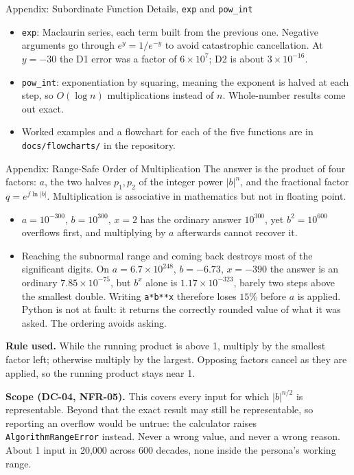 \documentclass[11pt]{beamer}
\begin{document}
\begin{frame}{Appendix: Subordinate Function Details, \texttt{exp} and \texttt{pow\_int}}
  \begin{itemize}
    \item \texttt{exp}: Maclaurin series, each term built from the previous
          one. Negative arguments go through $e^{y} = 1/e^{-y}$ to avoid
          catastrophic cancellation. At $y = -30$ the D1 error was a factor of
          $6\times10^{7}$; D2 is about $3\times10^{-16}$.
    \item \texttt{pow\_int}: exponentiation by squaring, meaning the exponent
          is halved at each step, so $O(\log n)$ multiplications instead of
          $n$. Whole-number results come out exact.
    \item Worked examples and a flowchart for each of the five functions are in
          \texttt{docs/flowcharts/} in the repository.
  \end{itemize}
\end{frame}

\begin{frame}{Appendix: Range-Safe Order of Multiplication}
  \footnotesize
  The answer is the product of four factors: $a$, the two halves
  $p_1, p_2$ of the integer power $|b|^{n}$, and the fractional factor
  $q = e^{f \ln |b|}$. Multiplication is associative in mathematics but not in
  floating point.
  \begin{itemize}
    \item $a = 10^{-300}$, $b = 10^{300}$, $x = 2$ has the ordinary answer
          $10^{300}$, yet $b^{2} = 10^{600}$ overflows first, and multiplying
          by $a$ afterwards cannot recover it.
    \item Reaching the subnormal range and coming back destroys most of the
          significant digits. On $a = 6.7 \times 10^{248}$, $b = -6.73$,
          $x = -390$ the answer is an ordinary $7.85 \times 10^{-75}$, but
          $b^{x}$ alone is $1.17 \times 10^{-323}$, barely two steps above
          the smallest double. Writing \texttt{a*b**x} therefore loses
          $15\%$ before $a$ is applied. Python is not at fault: it returns
          the correctly rounded value of what it was asked. The ordering
          avoids asking.
  \end{itemize}
  \textbf{Rule used.} While the running product is above 1, multiply by the
  smallest factor left; otherwise multiply by the largest. Opposing factors
  cancel as they are applied, so the running product stays near 1.
  \smallskip

  \textbf{Scope (DC-04, NFR-05).} This covers every input for which
  $|b|^{n/2}$ is representable. Beyond that the exact result may still be
  representable, so reporting an overflow would be untrue: the calculator
  raises \texttt{AlgorithmRangeError} instead. Never a wrong value, and
  never a wrong reason. About 1 input in 20{,}000 across 600 decades, none
  inside the persona's working range.
\end{frame}
\end{document}

